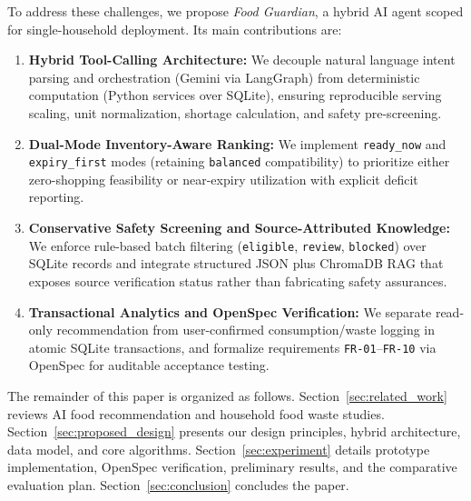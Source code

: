 To address these challenges, we propose \textit{Food Guardian}, a hybrid AI agent scoped for single-household deployment. Its main contributions are:
\begin{enumerate}
    \item \textbf{Hybrid Tool-Calling Architecture:} We decouple natural language intent parsing and orchestration (Gemini via LangGraph) from deterministic computation (Python services over SQLite), ensuring reproducible serving scaling, unit normalization, shortage calculation, and safety pre-screening.
    \item \textbf{Dual-Mode Inventory-Aware Ranking:} We implement \texttt{ready\_now} and \texttt{expiry\_first} modes (retaining \texttt{balanced} compatibility) to prioritize either zero-shopping feasibility or near-expiry utilization with explicit deficit reporting.
    \item \textbf{Conservative Safety Screening and Source-Attributed Knowledge:} We enforce rule-based batch filtering (\texttt{eligible}, \texttt{review}, \texttt{blocked}) over SQLite records and integrate structured JSON plus ChromaDB RAG that exposes source verification status rather than fabricating safety assurances.
    \item \textbf{Transactional Analytics and OpenSpec Verification:} We separate read-only recommendation from user-confirmed consumption/waste logging in atomic SQLite transactions, and formalize requirements \texttt{FR-01}--\texttt{FR-10} via OpenSpec for auditable acceptance testing.
\end{enumerate}

The remainder of this paper is organized as follows. Section~\ref{sec:related_work} reviews AI food recommendation and household food waste studies. Section~\ref{sec:proposed_design} presents our design principles, hybrid architecture, data model, and core algorithms. Section~\ref{sec:experiment} details prototype implementation, OpenSpec verification, preliminary results, and the comparative evaluation plan. Section~\ref{sec:conclusion} concludes the paper.
